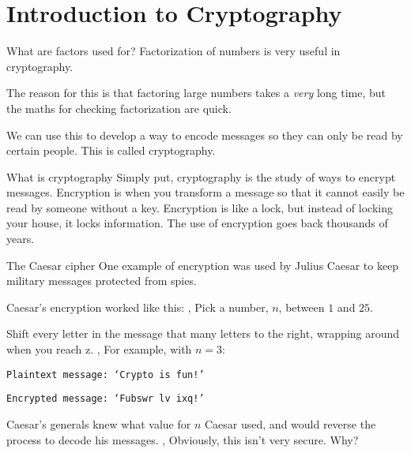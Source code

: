 \section{Introduction to Cryptography}
\begin{namedframe}{What are factors used for?}
	Factorization of numbers is very useful in cryptography.

	The reason for this is that factoring large numbers takes a \emph{very} long time, but the maths for checking factorization are quick.

	We can use this to develop a way to encode messages so they can only be read by certain people.
	This is called cryptography.
\end{namedframe}
\begin{namedframe}{What is cryptography}
	Simply put, cryptography is the study of ways to encrypt messages.
	\vertspace
	Encryption is when you transform a message so that it cannot easily be read by someone without a key.
	Encryption is like a lock, but instead of locking your house, it locks information.
	\vertspace
	The use of encryption goes back thousands of years.
\end{namedframe}
\begin{namedframe}{The Caesar cipher}
	One example of encryption was used by Julius Caesar to keep military messages protected from spies.

	Caesar's encryption worked like this:
	\sep
	Pick a number, $n$, between $1$ and $25$.

	Shift every letter in the message that many letters to the right, wrapping around when you reach z.
	\sep
	For example, with $n = 3$:

	\texttt{Plaintext message: `Crypto is fun!'}

	\texttt{Encrypted message: `Fubswr lv ixq!'}

	Caesar's generals knew what value for $n$ Caesar used, and would reverse the process to decode his messages.
	\sep
	Obviously, this isn't very secure. Why?
\end{namedframe}
